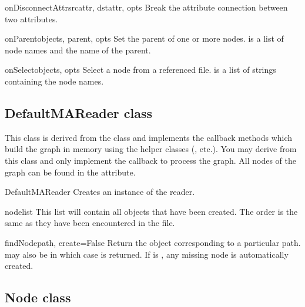 \begin{methoddesc}{onDisconnectAttr}{srcattr, dstattr, opts}
Break the attribute connection between two attributes.
\end{methoddesc}

\begin{methoddesc}{onParent}{objects, parent, opts}
Set the parent of one or more nodes.  is a list of node names
and  the name of the parent.
\end{methoddesc}

\begin{methoddesc}{onSelect}{objects, opts}
Select a node from a referenced file.  is a list of strings
containing the node names.
\end{methoddesc}

\subsection{DefaultMAReader class}

This class is derived from the  class and implements 
the callback methods which build the graph in memory using the helper
classes (, etc.). You may derive from this class and only
implement the  callback to process the graph. All nodes
of the graph can be found in the  attribute.

\begin{classdesc}{DefaultMAReader}{}
  Creates an instance of the reader.
\end{classdesc}

\begin{memberdesc}{nodelist}
This list will contain all  objects that have been created.
The order is the same as they have been encountered in the file.
\end{memberdesc}

\begin{methoddesc}{findNode}{path, create=False}
Return the  object corresponding to a particular path.
 may also be  in which case  is returned.
If  is , any missing node is automatically created.
\end{methoddesc}

\subsection{Node class}


